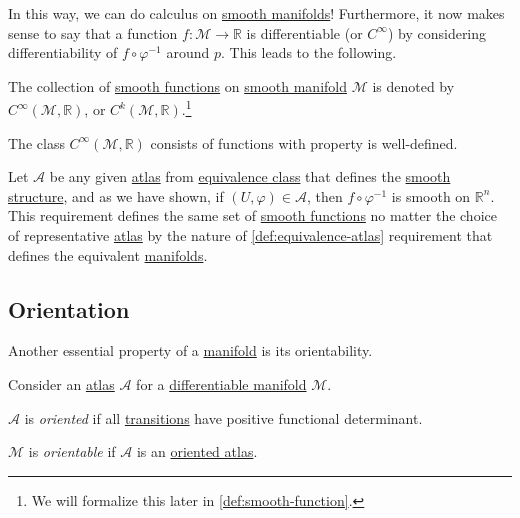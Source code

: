 In this way, we can do calculus on \hyperref[def:smooth-manifold]{smooth manifolds}! Furthermore, it now makes sense to say that a function \(f\colon \mathcal{M} \to \mathbb{R} \) is differentiable (or \(C^{\infty} \)) by considering differentiability of \(f \circ \varphi ^{-1} \) around \(p\). This leads to the following.

\begin{notation}
	The collection of \hyperref[def:smooth-function]{smooth functions} on \hyperref[def:smooth-manifold]{smooth manifold} \(\mathcal{M} \) is denoted by \(C^{\infty} (\mathcal{M} , \mathbb{R} )\), or \(C^k(\mathcal{M} , \mathbb{R} )\).\footnote{We will formalize this later in \autoref{def:smooth-function}.}
\end{notation}

\begin{remark}
	The class \(C^{\infty} (\mathcal{M} , \mathbb{R} )\) consists of functions with property is well-defined.
\end{remark}
\begin{explanation}
	Let \(\mathcal{A} \) be any given \hyperref[def:atlas]{atlas} from \hyperref[def:equivalence-atlas]{equivalence class} that defines the \hyperref[def:smooth-structure]{smooth structure}, and as we have shown, if \((U, \varphi)\in \mathcal{A} \), then \(f \circ \varphi ^{-1} \) is smooth on \(\mathbb{R} ^n\). This requirement defines the same set of \hyperref[def:smooth-function]{smooth functions} no matter the choice of representative \hyperref[def:atlas]{atlas} by the nature of \autoref{def:equivalence-atlas} requirement that defines the equivalent \hyperref[def:smooth-manifold]{manifolds}.
\end{explanation}

\subsection{Orientation}
Another essential property of a \hyperref[def:topological-manifold]{manifold} is its orientability.

\begin{definition*}
	Consider an \hyperref[def:atlas]{atlas} \(\mathcal{A} \) for a \hyperref[def:smooth-manifold]{differentiable manifold} \(\mathcal{M} \).
	\begin{definition}[Oriented]\label{def:oriented}
		\(\mathcal{A} \) is \emph{oriented} if all \hyperref[def:coordinate-transition]{transitions} have positive functional determinant.
	\end{definition}

	\begin{definition}[Orientable]\label{def:orientable}
		\(\mathcal{M} \) is \emph{orientable} if \(\mathcal{A} \) is an \hyperref[def:oriented]{oriented atlas}.
	\end{definition}
\end{definition*}

